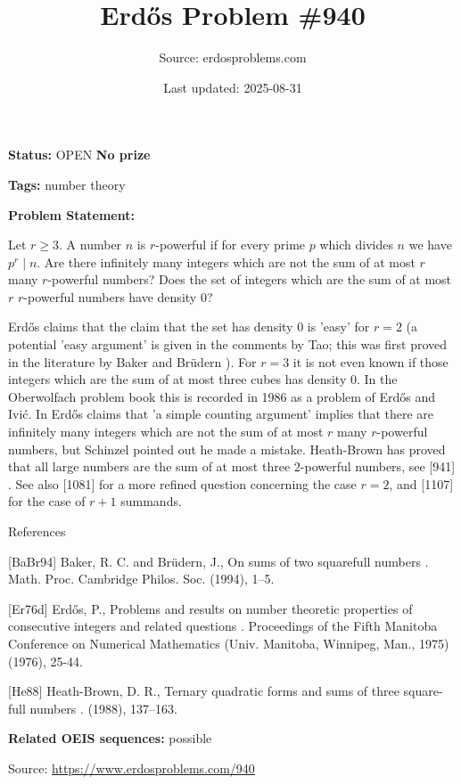 \documentclass{article}
\title{Erd\H{o}s Problem \#940}
\date{Last updated: 2025-08-31}
\author{Source: erdosproblems.com}
\begin{document}
\maketitle

\noindent\textbf{Status:} OPEN \quad \textbf{No prize}

\noindent\textbf{Tags:} number theory

\medskip

\noindent\textbf{Problem Statement:}

Let $r\geq 3$. A number $n$ is $r$-powerful if for every prime $p$ which divides $n$ we have $p^r\mid n$. Are there infinitely many integers which are not the sum of at most $r$ many $r$-powerful numbers? Does the set of integers which are the sum of at most $r$ $r$-powerful numbers have density $0$?




Erd\H{o}s \cite{Er76d} claims that the claim that the set has density $0$ is 'easy' for $r=2$ (a potential 'easy argument' is given in the comments by Tao; this was first proved in the literature by Baker and Br\"{u}dern \cite{BaBr94}). For $r=3$ it is not even known if those integers which are the sum of at most three cubes has density $0$. In the Oberwolfach problem book this is recorded in 1986 as a problem of Erd\H{o}s and Ivi\'{c}. In \cite{Er76d} Erd\H{o}s claims that 'a simple counting argument' implies that there are infinitely many integers which are not the sum of at most $r$ many $r$-powerful numbers, but Schinzel pointed out he made a mistake. Heath-Brown \cite{He88} has proved that all large numbers are the sum of at most three $2$-powerful numbers, see [941] . See also [1081] for a more refined question concerning the case $r=2$, and [1107] for the case of $r+1$ summands.




References

[BaBr94] Baker, R. C. and Br\"udern, J., On sums of two squarefull numbers . Math. Proc. Cambridge Philos. Soc. (1994), 1--5.

[Er76d] Erd\H{o}s, P., Problems and results on number theoretic properties of consecutive integers and related questions . Proceedings of the Fifth Manitoba Conference on Numerical Mathematics (Univ. Manitoba, Winnipeg, Man., 1975) (1976), 25-44.

[He88] Heath-Brown, D. R., Ternary quadratic forms and sums of three square-full numbers . (1988), 137--163.

\noindent\textbf{Related OEIS sequences:} possible


\bigskip
\noindent\small{Source: \url{https://www.erdosproblems.com/940}}
\end{document}
